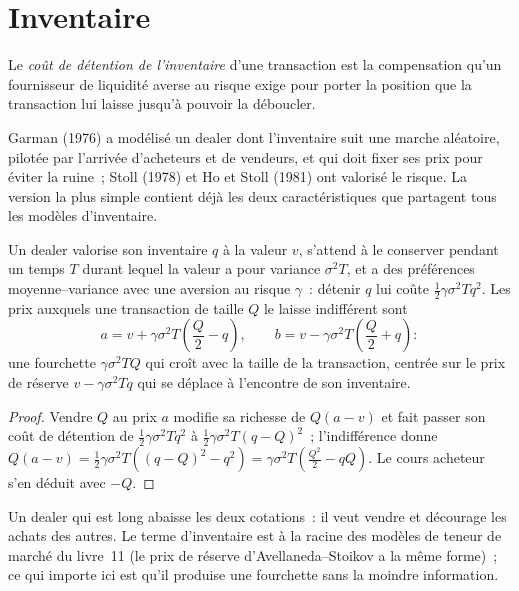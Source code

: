 \section{Inventaire}

\begin{definition}\label{def:mx:why-there-is-a-spread:inventory}
Le \emph{coût de détention de l'inventaire} d'une transaction est la compensation qu'un fournisseur de liquidité averse au risque exige pour porter
la position que la transaction lui laisse jusqu'à pouvoir la déboucler.
\end{definition}

Garman (1976) a modélisé un dealer dont l'inventaire suit une marche aléatoire, pilotée par l'arrivée d'acheteurs et de vendeurs, et qui doit fixer ses prix pour éviter la ruine~;
Stoll (1978) et Ho et Stoll (1981) ont valorisé le risque. La version la plus simple contient déjà les deux caractéristiques que partagent tous les modèles d'inventaire.

\begin{proposition}\label{prop:mx:why-there-is-a-spread:inventory}
Un dealer valorise son inventaire $q$ à la valeur $v$, s'attend à le conserver pendant un temps $T$ durant lequel la valeur a pour variance $\sigma^2T$, et a des préférences moyenne--variance
avec une aversion au risque $\gamma$~: détenir $q$ lui coûte $\tfrac12\gamma\sigma^2Tq^2$. Les prix auxquels une transaction de taille $Q$ le laisse indifférent
sont
\[
a = v + \gamma\sigma^2T\left(\frac Q2 - q\right),\qquad b = v - \gamma\sigma^2T\left(\frac Q2 + q\right):
\]
une fourchette $\gamma\sigma^2TQ$ qui croît avec la taille de la transaction, centrée sur le prix de réserve $v-\gamma\sigma^2Tq$ qui se déplace à l'encontre de son inventaire.
\end{proposition}

\begin{proof}
Vendre $Q$ au prix $a$ modifie sa richesse de $Q(a-v)$ et fait passer son coût de détention de $\tfrac12\gamma\sigma^2Tq^2$ à $\tfrac12\gamma\sigma^2T(q-Q)^2$~;
l'indifférence donne $Q(a-v)=\tfrac12\gamma\sigma^2T\left((q-Q)^2-q^2\right)=\gamma\sigma^2T\left(\tfrac{Q^2}{2}-qQ\right)$. Le cours acheteur s'en déduit avec $-Q$.
\end{proof}

Un dealer qui est long abaisse les deux cotations~: il veut vendre et décourage les achats des autres. Le terme d'inventaire est à la racine des modèles de teneur de marché
du livre~11 (le prix de réserve d'Avellaneda--Stoikov a la même forme)~; ce qui importe ici est qu'il produise une fourchette sans la moindre
information.

